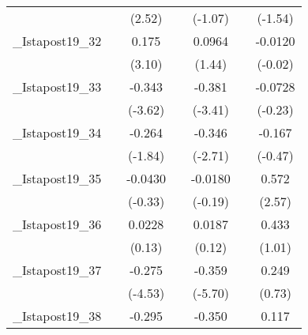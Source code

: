 {\begin{tabular}{l*{6}{c}}
            &                     &      (2.52)         &                     &     (-1.07)         &                     &     (-1.54)         \\
[1em]
\_Istapost19\_32&                     &       0.175\sym{**} &                     &      0.0964         &                     &     -0.0120         \\
            &                     &      (3.10)         &                     &      (1.44)         &                     &     (-0.02)         \\
[1em]
\_Istapost19\_33&                     &      -0.343\sym{***}&                     &      -0.381\sym{**} &                     &     -0.0728         \\
            &                     &     (-3.62)         &                     &     (-3.41)         &                     &     (-0.23)         \\
[1em]
\_Istapost19\_34&                     &      -0.264         &                     &      -0.346\sym{*}  &                     &      -0.167         \\
            &                     &     (-1.84)         &                     &     (-2.71)         &                     &     (-0.47)         \\
[1em]
\_Istapost19\_35&                     &     -0.0430         &                     &     -0.0180         &                     &       0.572\sym{*}  \\
            &                     &     (-0.33)         &                     &     (-0.19)         &                     &      (2.57)         \\
[1em]
\_Istapost19\_36&                     &      0.0228         &                     &      0.0187         &                     &       0.433         \\
            &                     &      (0.13)         &                     &      (0.12)         &                     &      (1.01)         \\
[1em]
\_Istapost19\_37&                     &      -0.275\sym{***}&                     &      -0.359\sym{***}&                     &       0.249         \\
            &                     &     (-4.53)         &                     &     (-5.70)         &                     &      (0.73)         \\
[1em]
\_Istapost19\_38&                     &      -0.295\sym{***}&                     &      -0.350\sym{***}&                     &       0.117         \\

\end{tabular}}
